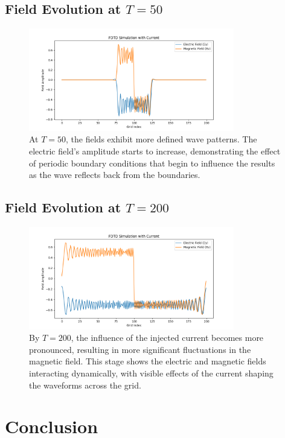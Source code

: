 \documentclass{article}[a4paper]
\begin{document}
\subsection{Field Evolution at \( T = 50 \)}
\begin{figure}[H]
    \centering
    \includegraphics[width=0.8\textwidth]{materials/Figure_50.png}
    \caption{At \( T = 50 \), the fields exhibit more defined wave patterns. The electric field's amplitude starts to increase, demonstrating the effect of periodic boundary conditions that begin to influence the results as the wave reflects back from the boundaries.}
\end{figure}

\subsection{Field Evolution at \( T = 200 \)}
\begin{figure}[H]
    \centering
    \includegraphics[width=0.8\textwidth]{materials/Figure_200.png}
    \caption{By \( T = 200 \), the influence of the injected current becomes more pronounced, resulting in more significant fluctuations in the magnetic field. This stage shows the electric and magnetic fields interacting dynamically, with visible effects of the current shaping the waveforms across the grid.}
\end{figure}

\section{Conclusion}
\end{document}
